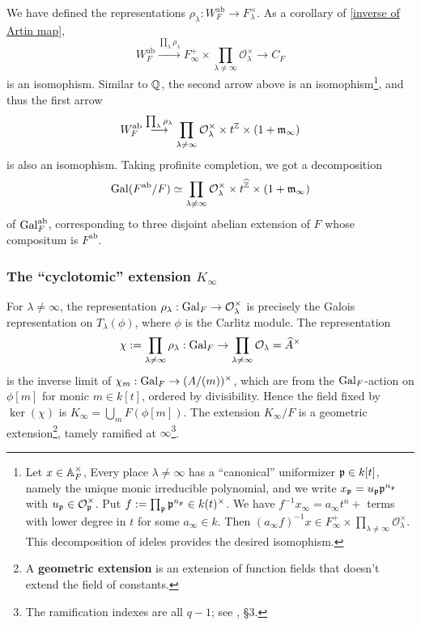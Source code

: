 \documentclass{article}
\renewcommand{\O}{\mathcal{O}}
\newcommand{\m}{\mathfrak{m}}
\newcommand{\ab}{\mathrm{ab}}
\begin{document}
We have defined the representations $\rho_\lambda : W_F^\ab\to F_\lambda^\times$.
As a corollary of \cref{inverse of Artin map},
\[W_F^\ab \stackrel{\prod_{\lambda}\rho_\lambda}{\longrightarrow} F_\infty^+\times\prod_{\lambda\ne\infty}\O_\lambda^\times\to C_F\]
is an isomophism.
Similar to $\mathbb{Q}$, the second arrow above is an isomophism\footnote{
Let $x\in \mathbb{A}_F^\times$,
Every place $\lambda\ne\infty$ has a ``canonical'' uniformizer $\mathfrak{p}\in k[t]$, namely the unique monic irreducible polynomial,
and we write $x_{\mathfrak{p}} = u_{\mathfrak{p}}\mathfrak{p}^{n_{\mathfrak{p}}}$ with $u_\p\in \O_\p^\times$.
Put $f := \prod_{\mathfrak{p}}\mathfrak{p}^{n_{\mathfrak{p}}}\in k(t)^\times$.
We have $f^{-1}x_\infty = a_\infty t^{n} + {}$ terms with lower degree in $t$ for some $a_\infty\in k$.
Then $(a_\infty f)^{-1}x\in F_\infty^+\times\prod_{\lambda\ne\infty}\O_\lambda^\times$.
This decomposition of ideles provides the desired isomophism.
}, and thus the first arrow
\[W_F^\ab\stackrel{\prod_{\lambda}\rho_\lambda}{\longrightarrow} \prod_{\lambda\ne\infty}\O_\lambda^\times \times t^{\Z}\times (1 + \m_\infty)\]
is also an isomophism.
Taking profinite completion, we got a decomposition
\[\gal(F^\ab/F)
\simeq \prod_{\lambda\ne\infty}\O_\lambda^\times \times t^{\hat\Z}\times (1 + \m_\infty)\]
of $\gal_F^\ab$, corresponding to three disjoint abelian extension of $F$ whose compositum is $F^\ab$.

\subsubsection*{The ``cyclotomic'' extension \texorpdfstring{$K_\infty$}{K_infty}}
For $\lambda\ne\infty$, the representation $\rho_\lambda : \gal_F\to \O_\lambda^\times$ is precisely the Galois representation on $T_\lambda(\phi)$, where $\phi$ is the Carlitz module.
The representation \[\chi := \prod_{\lambda\ne\infty}\rho_\lambda : \gal_F\to \prod_{\lambda\ne\infty}\O_\lambda = \hat A^\times\]
is the inverse limit of $\chi_m : \operatorname{Gal}_F\to (A/(m))^\times$, which are from the $\operatorname{Gal}_F$-action on $\phi[m]$ for monic $m\in k[t]$, ordered by divisibility.
Hence the field fixed by $\ker(\chi)$ is $K_\infty = \bigcup_{m} F(\phi[m])$.
The extension $K_\infty/F$ is a geometric extension\footnote{A \textbf{geometric extension} is an extension of function fields that doesn't extend the field of constants.}, tamely ramified at $\infty$\footnote{
    The ramification indexes are all $q - 1$; see \cite{Ha74}, \S 3.
}.
\end{document}
